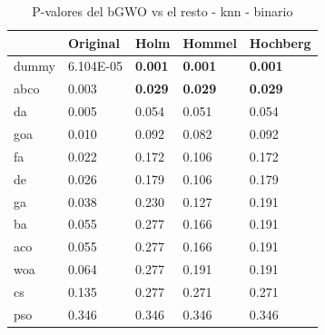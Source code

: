 \begin{table}[htp]
    \centering
    \begin{tabular}{lllll}
        \toprule
        {}    & Original  & Holm           & Hommel         & Hochberg       \\
        \midrule
        dummy & 6.104E-05 & \textbf{0.001} & \textbf{0.001} & \textbf{0.001} \\
        abco  & 0.003     & \textbf{0.029} & \textbf{0.029} & \textbf{0.029} \\
        da    & 0.005     & 0.054          & 0.051          & 0.054          \\
        goa   & 0.010     & 0.092          & 0.082          & 0.092          \\
        fa    & 0.022     & 0.172          & 0.106          & 0.172          \\
        de    & 0.026     & 0.179          & 0.106          & 0.179          \\
        ga    & 0.038     & 0.230          & 0.127          & 0.191          \\
        ba    & 0.055     & 0.277          & 0.166          & 0.191          \\
        aco   & 0.055     & 0.277          & 0.166          & 0.191          \\
        woa   & 0.064     & 0.277          & 0.191          & 0.191          \\
        cs    & 0.135     & 0.277          & 0.271          & 0.271          \\
        pso   & 0.346     & 0.346          & 0.346          & 0.346          \\
        \bottomrule
    \end{tabular}
    \caption{P-valores del bGWO vs el resto - knn - binario}
    \label{tab:p-values_gwo_vs_rest_knn}
\end{table}

